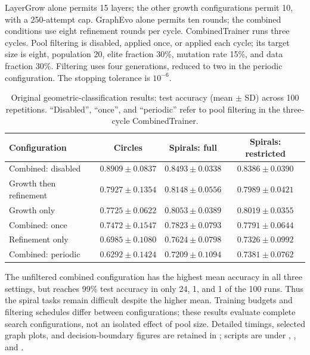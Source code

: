 LayerGrow alone permits 15 layers; the other growth configurations permit
10, with a 250-attempt cap. GraphEvo alone permits ten rounds; the combined
conditions use eight refinement rounds per cycle. CombinedTrainer runs three
cycles. Pool filtering is disabled, applied once, or applied each cycle;
its target size is eight, population 20, elite fraction 30\%, mutation rate
15\%, and data fraction 30\%. Filtering uses four generations, reduced to two
in the periodic configuration. The stopping tolerance is $10^{-6}$.

\begin{table}[tb]
\centering\small
\caption{Original geometric-classification results: test accuracy (mean
$\pm$ SD) across 100 repetitions. ``Disabled'', ``once'', and ``periodic''
refer to pool filtering in the three-cycle CombinedTrainer.}
\label{tab:compact_geometry}
\begin{tabular}{lccc}
\toprule
Configuration & Circles & Spirals: full & Spirals: restricted \\
\midrule
Combined: disabled & $0.8909\pm0.0837$ & $0.8493\pm0.0338$ & $0.8386\pm0.0390$ \\
Growth then refinement & $0.7927\pm0.1354$ & $0.8148\pm0.0556$ & $0.7989\pm0.0421$ \\
Growth only & $0.7725\pm0.0622$ & $0.8053\pm0.0389$ & $0.8019\pm0.0355$ \\
Combined: once & $0.7472\pm0.1547$ & $0.7823\pm0.0793$ & $0.7791\pm0.0644$ \\
Refinement only & $0.6985\pm0.1080$ & $0.7624\pm0.0798$ & $0.7326\pm0.0992$ \\
Combined: periodic & $0.6292\pm0.1424$ & $0.7209\pm0.1094$ & $0.7381\pm0.0762$ \\
\bottomrule
\end{tabular}
\end{table}

The unfiltered combined configuration has the highest mean accuracy in all
three settings, but reaches 99\% test accuracy in only 24, 1, and 1 of the
100 runs. Thus the spiral tasks remain difficult despite the higher mean.
Training budgets and filtering schedules differ between configurations;
these results evaluate complete search configurations, not an isolated effect
of pool size. Detailed timings, selected graph plots, and decision-boundary
figures are retained in ; scripts are under
,
, and
.

